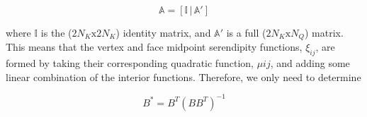 \begin{equation}
\label{eq::BF_quad_Amat_simple}
\mathbb{A} = \left[ \mathbb{I} \, | \, \mathbb{A}' \right]
\end{equation}

\noindent where $\mathbb{I}$ is the ($2 N_K \text{x} 2 N_K$) identity matrix, and $\mathbb{A}'$ is a full ($2 N_K \text{x}  N_Q$) matrix. This means that the vertex and face midpoint serendipity functions, $\xi_{ij}$, are formed by taking their corresponding quadratic function, $\mu{ij}$, and adding some linear combination of the interior functions. Therefore, we only need to determine 

\begin{equation}
\label{eq::BF_quad_MP_inverse}
B^* = B^T (B B^T)^{-1}
\end{equation}


